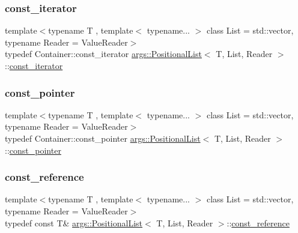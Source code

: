 \mbox{\label{classargs_1_1_positional_list_a5675a3e27a2a7fc6a7fbd933bd13f3cf}} 
\subsubsection{\texorpdfstring{const\+\_\+iterator}{const\_iterator}}
{\footnotesize\ttfamily template$<$typename T , template$<$ typename... $>$ class List = std\+::vector, typename Reader  = Value\+Reader$>$ \\
typedef Container\+::const\+\_\+iterator \hyperlink{classargs_1_1_positional_list}{args\+::\+Positional\+List}$<$ T, List, Reader $>$\+::\hyperlink{classargs_1_1_positional_list_a5675a3e27a2a7fc6a7fbd933bd13f3cf}{const\+\_\+iterator}}

\mbox{\label{classargs_1_1_positional_list_a69c3560bf0c2722cef3f00c25128bb4e}} 
\subsubsection{\texorpdfstring{const\+\_\+pointer}{const\_pointer}}
{\footnotesize\ttfamily template$<$typename T , template$<$ typename... $>$ class List = std\+::vector, typename Reader  = Value\+Reader$>$ \\
typedef Container\+::const\+\_\+pointer \hyperlink{classargs_1_1_positional_list}{args\+::\+Positional\+List}$<$ T, List, Reader $>$\+::\hyperlink{classargs_1_1_positional_list_a69c3560bf0c2722cef3f00c25128bb4e}{const\+\_\+pointer}}

\mbox{\label{classargs_1_1_positional_list_a121abd55046913651cb63bd6a083a492}} 
\subsubsection{\texorpdfstring{const\+\_\+reference}{const\_reference}}
{\footnotesize\ttfamily template$<$typename T , template$<$ typename... $>$ class List = std\+::vector, typename Reader  = Value\+Reader$>$ \\
typedef const T\& \hyperlink{classargs_1_1_positional_list}{args\+::\+Positional\+List}$<$ T, List, Reader $>$\+::\hyperlink{classargs_1_1_positional_list_a121abd55046913651cb63bd6a083a492}{const\+\_\+reference}}

